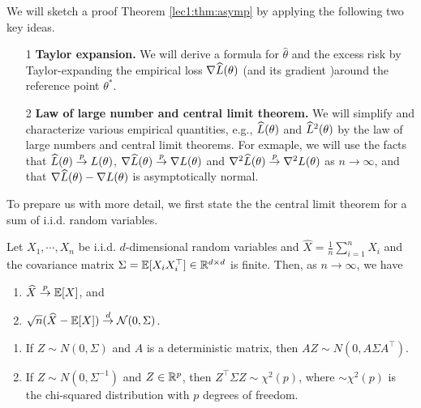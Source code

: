 
We will sketch a proof Theorem \ref{lec1:thm:asymp} by applying the following two key ideas. 
\begin{enumerate}
    \item[1] \textbf{Taylor expansion.} We will derive a formula for $\hat{\theta}$ and the excess risk by Taylor-expanding the empirical loss $\nabla \widehat{L}(\theta)$ (and its gradient )around the reference point $\theta^{*}$.
    \item[2] \textbf{Law of large number and central limit theorem.} We will simplify and characterize various empirical quantities, e.g.,  $\widehat{L}(\theta)$ and $\widehat{L}^2(\theta)$ by the law of large numbers and central limit theorems. For exmaple, we will use the facts that $\widehat{L}(\theta) \overset{p}{\to} L(\theta)$, $\nabla\widehat{L}(\theta) \overset{p}{\to} \nabla L(\theta)$   and  $\nabla^{2}\widehat{L}(\theta) \overset{p}{\to} \nabla^{2} L(\theta)$ as $n \to \infty$, and that $\nabla \widehat{L}(\theta)-\nabla L(\theta)$ is asymptotically normal. 
\end{enumerate}
 
To prepare us with more detail, we first state the the central limit theorem for a sum of i.i.d. random variables.

\begin{theorem} \label{lec1:thm:CLT}
Let $X_1, \cdots, X_n$ be i.i.d. $d$-dimensional random variables and $\widehat{X}=\frac{1}{n} \sum_{i=1}^{n} X_i$ and the covariance matrix $\Sigma = \operatorname*{\mathbb{E}}[X_iX_i^\top]\in \mathbb R^{d\times d}$ is finite. Then, as $n \to \infty$, we have
\begin{enumerate}
    \item $\widehat{X} \overset{p}{\to} \operatorname*{\mathbb{E}}[X]$, and
    \item $\sqrt{n} (\widehat{X}-\operatorname*{\mathbb{E}}[X]) \overset{d}{\to} \mathcal{N}(0,\Sigma)$. %
\end{enumerate}
\end{theorem}

\begin{lemma}\label{lec1:lem:dist}
\quad\quad
    \begin{enumerate}
        \item If $Z \sim N(0, \Sigma)$ and $A$ is a deterministic matrix, then $AZ \sim N(0, A \Sigma A^\top)$.
        
        \item If $Z \sim N(0, \Sigma^{-1})$ and $Z \in \mathbb R^p$, then $Z^\top \Sigma Z \sim \chi^2(p)$, where $\sim \chi^2(p)$ is the chi-squared distribution with $p$ degrees of freedom.
    \end{enumerate}
\end{lemma}

